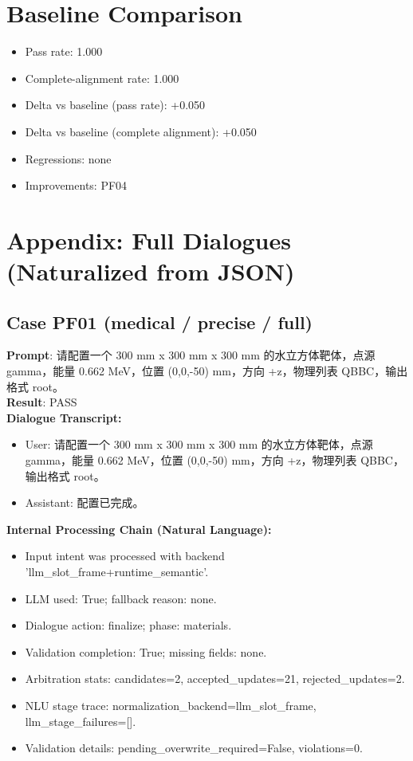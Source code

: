 \documentclass[11pt]{ctexart}
\begin{document}
\section{Baseline Comparison}
\begin{itemize}
\item Pass rate: 1.000
\item Complete-alignment rate: 1.000
\item Delta vs baseline (pass rate): +0.050
\item Delta vs baseline (complete alignment): +0.050
\item Regressions: none
\item Improvements: PF04
\end{itemize}
\appendix
\section{Appendix: Full Dialogues (Naturalized from JSON)}
\subsection{Case PF01 (medical / precise / full)}
\textbf{Prompt}: 请配置一个 300 mm x 300 mm x 300 mm 的水立方体靶体，点源 gamma，能量 0.662 MeV，位置 (0,0,-50) mm，方向 +z，物理列表 QBBC，输出格式 root。\\
\textbf{Result}: PASS\\
\textbf{Dialogue Transcript:}
\begin{itemize}
\item User: 请配置一个 300 mm x 300 mm x 300 mm 的水立方体靶体，点源 gamma，能量 0.662 MeV，位置 (0,0,-50) mm，方向 +z，物理列表 QBBC，输出格式 root。
\item Assistant: 配置已完成。
\end{itemize}
\textbf{Internal Processing Chain (Natural Language):}
\begin{itemize}
\item Input intent was processed with backend 'llm\_slot\_frame+runtime\_semantic'.
\item LLM used: True; fallback reason: none.
\item Dialogue action: finalize; phase: materials.
\item Validation completion: True; missing fields: none.
\item Arbitration stats: candidates=2, accepted\_updates=21, rejected\_updates=2.
\item NLU stage trace: normalization\_backend=llm\_slot\_frame, llm\_stage\_failures=[].
\item Validation details: pending\_overwrite\_required=False, violations=0.
\end{itemize}
\end{document}
